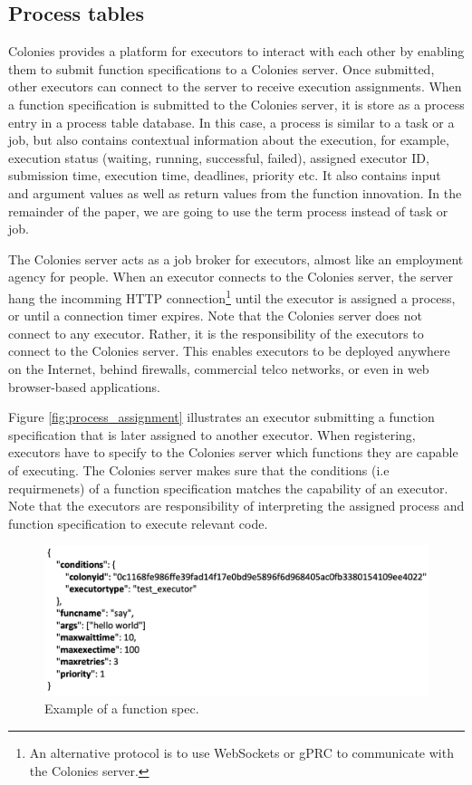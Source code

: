 \documentclass{article}
\begin{document}
\subsection{Process tables}
Colonies provides a platform for executors to interact with each other by enabling them to submit function specifications to a Colonies server. Once submitted, other executors can connect to the server to receive execution assignments. When a function specification is submitted to the Colonies server, it is store as a process entry in a process table database. In this case, a process is similar to a task or a job, but also contains contextual information about the execution, for example, execution status (waiting, running, successful, failed), assigned executor ID, submission time, execution time, deadlines, priority etc. It also contains input and argument values as well as return values from the function innovation. In the remainder of the paper, we are going to use the term process instead of task or job.

The Colonies server acts as a job broker for executors, almost like an employment agency for people. When an executor connects to the Colonies server, the server hang the incomming HTTP connection\footnote{An alternative protocol is to use WebSockets or gPRC to communicate with the Colonies server.} until the executor is assigned a process, or until a connection timer expires. Note that the Colonies server does not connect to any executor. Rather, it is the responsibility of the executors to connect to the Colonies server. This enables executors to be deployed anywhere on the Internet, behind firewalls, commercial telco networks, or even in web browser-based applications.

Figure \ref{fig:process_assignment} illustrates an executor submitting a function specification that is later assigned to another executor. When registering, executors have to specify to the Colonies server which functions they are capable of executing. The Colonies server makes sure that the conditions (i.e requirmenets) of a function specification matches the capability of an executor. Note that the executors are responsibility of interpreting the assigned process and function specification to execute relevant code.

\begin{figure}[h]
	\centering
    \includegraphics[scale=0.35]{function_spec.png}
	\caption{Example of a function spec.}
	\label{fig:function_spec}
\end{figure}
\end{document}
